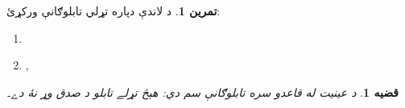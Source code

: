 \documentclass[12pt,a4paper,oneside]{report}
\newcommand{\olfileid}[3]{\gdef\pspart{#1}\gdef\pschapter{#2}\gdef\pssection{#3}}
\gdef\pspart{#2}\gdef\pschapter{#3}\gdef\pssection{}%
\newtheorem{prop}[thm]{قضيه}
\theoremstyle{definition}
\newtheorem{prob}[thm]{تمرين}
\begin{document}
\label{olpseg:OLP-0110-B011:start}
\begin{prob}
د لاندې دپاره تړلي تابلوګانې ورکړئ:
\begin{enumerate}
\item \LR{$\sFmla{\False}{\lforall[x][\lforall[y][((x = y \land !A(x))
      \lif !A(y))]]}$}
\item {},\\
  \LR{$\sFmla{\True}{\lexists[x][!A(x)] \land
    \lforall[y][\lforall[z][((!A(y) \land !A(z)) \lif y = z)]]}$}
\end{enumerate}
\end{prob}
\label{olpseg:OLP-0110-B011:end}

\label{olpseg:OLP-0111-B004:start}
\olfileid{fol}{tab}{sid}
\label{olpseg:OLP-0111-B004:end}

\label{olpseg:OLP-0111-B005:start}
\label{olpseg:OLP-0111-B005:end}

\label{olpseg:OLP-0111-B006:start}
\begin{prop}
د عينيت له قاعدو سره تابلوګانې سم دي: هېڅ تړلے تابلو
د صدق وړ نۀ دے۔
\end{prop}
\label{olpseg:OLP-0111-B006:end}
\end{document}
